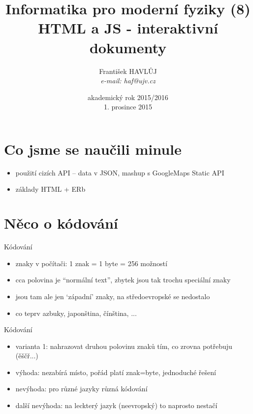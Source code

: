 \documentclass{beamer}
\title[IMF (8)]{Informatika pro moderní fyziky (8)\\ HTML a JS - interaktivní dokumenty}
\author[Franti\v{s}ek HAVL\r{U}J, ORF ÚJV Řež]{Franti\v{s}ek HAVL\r{U}J\\{\scriptsize \emph{e-mail: haf@ujv.cz}}}
\date{akademický rok 2015/2016\\1. prosince 2015}
\institute[ORF ÚJV Řež]
{ÚJV Řež\\oddělení Reaktorové fyziky a podpory palivového cyklu}
\begin{document}
\begin{frame}
  \titlepage
\end{frame}

\begin{frame}
  \tableofcontents
\end{frame}

\section{Co jsme se naučili minule}

\begin{frame}{}
  \begin{itemize}
    \item použití cizích API – data v JSON, mashup s GoogleMaps Static API
    \item základy HTML + ERb
  \end{itemize}
\end{frame}

\section{Něco o kódování}

\begin{frame}{Kódování}
  \begin{itemize}
    \item znaky v počítači: 1 znak = 1 byte = 256 možností
    \item cca polovina je ``normální text'', zbytek jsou tak trochu speciální znaky
    \item jsou tam ale jen `západní' znaky, na středoevropské se nedostalo
    \item co teprv azbuky, japonština, čínština, ...
  \end{itemize}
\end{frame}

\begin{frame}{Kódování}
  \begin{itemize}
    \item varianta 1: nahrazovat druhou polovinu znaků tím, co zrovna potřebuju (ěščř...)
    \item výhoda: nezabírá místo, pořád platí znak=byte, jednoduché řešení
    \item nevýhoda: pro různé jazyky různá kódování
    \item další nevýhoda: na leckterý jazyk (neevropský) to naprosto nestačí
  \end{itemize}
\end{frame}
\end{document}
